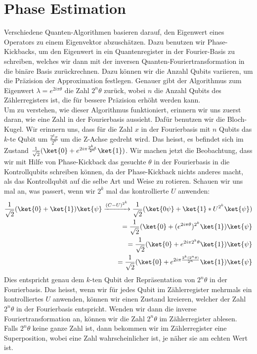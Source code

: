 \section{Phase Estimation}
Verschiedene Quanten-Algorithmen basieren darauf, den Eigenwert eines Operators zu einem Eigenvektor abzuschätzen. Dazu benutzen wir Phase-Kickbacks, um den Eigenwert in ein Quantenregister in der Fourier-Basis zu schreiben, welches wir dann mit der inversen Quanten-Fouriertransformation in die binäre Basis zurückrechnen. Dazu können wir die Anzahl Qubits variieren, um die Präzision der Approximation festlegen. Genauer gibt der Algorithmus zum Eigenwert $\lambda = e^{2i\pi\theta}$ die Zahl $2^n\theta$ zurück, wobei $n$ die Anzahl Qubits des Zählerregisters ist, die für bessere Präzision erhöht werden kann. 
\\
Um zu verstehen, wie dieser Algorithmus funktioniert, erinnern wir uns zuerst daran, wie eine Zahl in der Fourierbasis aussieht. Dafür benutzen wir die Bloch-Kugel. Wir erinnern uns, dass für die Zahl $x$ in der Fourierbasis mit $n$ Qubits das $k$-te Qubit um $\frac{2^kx}{2^n}$ um die Z-Achse gedreht wird. Das heisst, es befindet sich im Zustand $\frac{1}{\sqrt{2}}(\ket{0} + e^{2i\pi\frac{2^kx}{2^n}}\ket{1})$. Wir machen jetzt die Beobachtung, dass wir mit Hilfe von Phase-Kickback das gesuchte $\theta$ in der Fourierbasis in die Kontrollqubits schreiben können, da der Phase-Kickback nichts anderes macht, als das Kontrollqubit auf die selbe Art und Weise zu rotieren. Schauen wir uns mal an, was passert, wenn wir $2^k$ mal das kontrollierte $U$ anwenden:
\begin{align*}
\frac{1}{\sqrt{2}}(\ket{0} + \ket{1})\ket{\psi} \xrightarrow{(C-U)^{2^k}} \frac{1}{\sqrt{2}}(\ket{0\psi} + \ket{1}*U^{2^k}\ket{\psi}) \\ = \frac{1}{\sqrt{2}}(\ket{0} + (e^{2i\pi\theta})^{2^k}\ket{1})\ket{\psi} \\
= \frac{1}{\sqrt{2}}(\ket{0} + e^{2i\pi2^k\theta}\ket{1})\ket{\psi} \\
= \frac{1}{\sqrt{2}}(\ket{0} + e^{2i\pi\frac{2^k(2^n\theta)}{2^n}}\ket{1})\ket{\psi}
\end{align*}
Dies entspricht genau dem $k$-ten Qubit der Repräsentation von $2^n\theta$ in der Fourierbasis. Das heisst, wenn wir für jedes Qubit im Zählerregister mehrmals ein kontrolliertes $U$ anwenden, können wir einen Zustand kreieren, welcher der Zahl $2^n\theta$ in der Fourierbasis entspricht. Wenden wir dann die inverse Fouriertransformation an, können wir die Zahl $2^n\theta$ im Zählerregister ablesen. Falls $2^n\theta$ keine ganze Zahl ist, dann bekommen wir im Zählerregister eine Superposition, wobei eine Zahl wahrscheinlicher ist, je näher sie am echten Wert ist.

